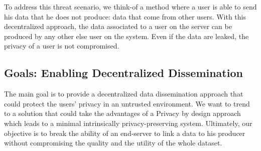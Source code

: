 To address this threat scenario, we think-of a method where a user is able to send his data that he does not produce: data that come from other users.
With this decentralized approach, the data associated to a user on the server can be produced by any other else user on the system.
Even if the data are leaked, the privacy of a user is not compromised.

\subsection{Goals: Enabling Decentralized Dissemination}

The main goal is to provide a decentralized data dissemination approach that could protect the users' privacy in an untrusted environment.
We want to trend to a solution that could take the advantages of a Privacy by design approach which leads to a minimal intrinsically privacy-preserving system.
Ultimately, our objective is to break the ability of an end-server to link a data to his producer without compromising the quality and the utility of the whole dataset.

